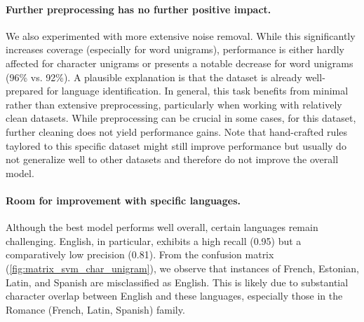 \paragraph{Further preprocessing has no further positive impact.}
We also experimented with more extensive noise removal. While this significantly increases coverage (especially for word unigrams), performance is either hardly affected for character unigrams or presents a notable decrease for word unigrams (96\% vs. 92\%). A plausible explanation is that the dataset is already well-prepared for language identification. In general, this task benefits from minimal rather than extensive preprocessing, particularly when working with relatively clean datasets. While preprocessing can be crucial in some cases, for this dataset, further cleaning does not yield performance gains. Note that hand-crafted rules taylored to this specific dataset might still improve performance but usually do not generalize well to other datasets and therefore do not improve the overall model.

\paragraph{Room for improvement with specific languages.}
Although the best model performs well overall, certain languages remain challenging. English, in particular, exhibits a high recall (0.95) but a comparatively low precision (0.81). From the confusion matrix (\cref{fig:matrix_svm_char_unigram}), we observe that instances of French, Estonian, Latin, and Spanish are misclassified as English. This is likely due to substantial character overlap between English and these languages, especially those in the Romance (French, Latin, Spanish) family. \cite{AbhishekPandey2023}
